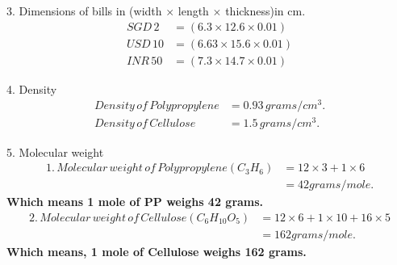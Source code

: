 \documentclass[11pt]{exam}
\begin{document}
\begin{questions}
                 3. Dimensions of bills in (width $\times$ length $\times$ thickness)in cm.
                 \begin{align*}
                 SGD\, 2 &= (6.3 \times 12.6 \times 0.01) \\
                 USD\, 10 &= (6.63 \times 15.6 \times 0.01)\\
                 INR\, 50 &= (7.3 \times 14.7 \times 0.01)   
                 \end{align*}                
                            
                 4. Density
                    \begin{align*} Density\, of\, Polypropylene &= 0.93\, grams/cm^{3}.\\              
                    Density\, of\, Cellulose &= 1.5\,grams/cm^{3}.
                    \end{align*}
                    
                 
                 5. Molecular weight
\begin{align*} 1.\,Molecular\, weight\, of\, Polypropylene(C_{3}H_{6}) &= 12 \times 3 + 1\times6 \\
&= 42 grams/mole.  \end{align*} 
\textbf{Which means 1 mole of PP weighs 42 grams.} \\
                 
\begin{align*} 2.\,Molecular\, weight\, of\, Cellulose (C_{6}H_{10}O_{5}) &= 12\times6 + 1\times10 + 16\times5 \\
&= 162 grams/mole. \end{align*} 
\textbf{Which means, 1 mole of Cellulose weighs 162 grams.} \\ \\

\end{questions}
\end{document}
